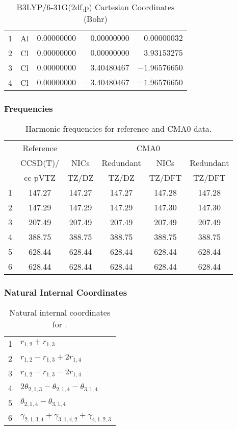 \documentclass[10pt,oneside]{article}
\begin{document}
\begin{table}[h]
\centering
\caption{B3LYP/6-31G(2df,p) Cartesian Coordinates (Bohr)}
\begin{tabular}{llrrr}
\toprule
1  & Al & $ 0.00000000$ & $ 0.00000000$ & $ 0.00000032$ \\
2  & Cl & $ 0.00000000$ & $ 0.00000000$ & $ 3.93153275$ \\
3  & Cl & $ 0.00000000$ & $ 3.40480467$ & $-1.96576650$ \\
4  & Cl & $ 0.00000000$ & $-3.40480467$ & $-1.96576650$ \\
\bottomrule
\end{tabular}
\end{table}

\begin{table}[h!]
\subsubsection*{Frequencies}
\centering
\caption{Harmonic frequencies for reference and CMA0 data.}
\begin{tabular}{cccccc}
\toprule
{} & Reference & \multicolumn{4}{c}{CMA0} \\
{} &  CCSD(T)/ &   NICs &  Redundant &   NICs & Redundant \\
{} &   cc-pVTZ &  TZ/DZ &      TZ/DZ & TZ/DFT &    TZ/DFT \\
\midrule
1 &    147.27 & 147.27 &     147.27 & 147.28 &    147.28 \\
2 &    147.29 & 147.29 &     147.29 & 147.30 &    147.30 \\
3 &    207.49 & 207.49 &     207.49 & 207.49 &    207.49 \\
4 &    388.75 & 388.75 &     388.75 & 388.75 &    388.75 \\
5 &    628.44 & 628.44 &     628.44 & 628.44 &    628.44 \\
6 &    628.44 & 628.44 &     628.44 & 628.44 &    628.44 \\
\bottomrule
\end{tabular}
\end{table}

\begin{table}[h!]
\subsubsection*{Natural Internal Coordinates}
\centering
\caption{Natural internal coordinates for .}
\small
\begin{tabular}{ll}
\toprule
  1   & $r_{1,2} + r_{1,3}$ \\
  2   & $r_{1,2} - r_{1,3} + 2r_{1,4}$ \\
  3   & $r_{1,2} - r_{1,3} - 2r_{1,4}$ \\
  4   & $2\theta_{2,1,3} - \theta_{2,1,4} - \theta_{3,1,4}$ \\
  5   & $\theta_{2,1,4} - \theta_{3,1,4}$ \\
  6   & $\gamma_{2,1,3,4} + \gamma_{3,1,4,2} + \gamma_{4,1,2,3}$ \\
\bottomrule
\end{tabular}
\end{table}
\end{document}
